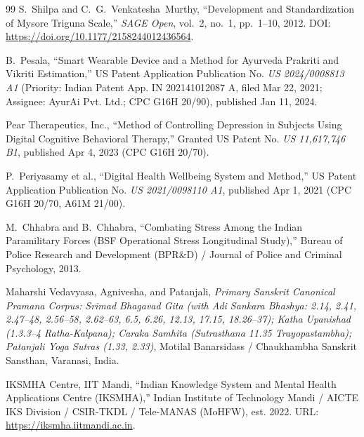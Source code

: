 \documentclass[11pt,a4paper]{article}
\begin{document}
\begin{thebibliography}{99}
S.~Shilpa and C.~G.~Venkatesha~Murthy,
``Development and Standardization of Mysore Triguna Scale,''
\textit{SAGE Open}, vol.~2, no.~1, pp.~1--10, 2012. DOI: \url{https://doi.org/10.1177/2158244012436564}.

B.~Pesala,
``Smart Wearable Device and a Method for Ayurveda Prakriti and Vikriti Estimation,''
US Patent Application Publication No. \textit{US 2024/0008813 A1} (Priority: Indian Patent App. IN 202141012087 A, filed Mar 22, 2021; Assignee: AyurAi Pvt. Ltd.; CPC G16H 20/90), published Jan 11, 2024.

Pear Therapeutics, Inc.,
``Method of Controlling Depression in Subjects Using Digital Cognitive Behavioral Therapy,''
Granted US Patent No. \textit{US 11,617,746 B1}, published Apr 4, 2023 (CPC G16H 20/70).

P.~Periyasamy et al.,
``Digital Health Wellbeing System and Method,''
US Patent Application Publication No. \textit{US 2021/0098110 A1}, published Apr 1, 2021 (CPC G16H 20/70, A61M 21/00).

M.~Chhabra and B.~Chhabra,
``Combating Stress Among the Indian Paramilitary Forces (BSF Operational Stress Longitudinal Study),''
Bureau of Police Research and Development (BPR\&D) / Journal of Police and Criminal Psychology, 2013.

Maharshi Vedavyasa, Agnivesha, and Patanjali,
\textit{Primary Sanskrit Canonical Pramana Corpus: Srimad Bhagavad Gita (with Adi Sankara Bhashya: 2.14, 2.41, 2.47--48, 2.56--58, 2.62--63, 6.5, 6.26, 12.13, 17.15, 18.26--37); Katha Upanishad (1.3.3--4 Ratha-Kalpana); Caraka Samhita (Sutrasthana 11.35 Trayopastambha); Patanjali Yoga Sutras (1.33, 2.33)},
Motilal Banarsidass / Chaukhambha Sanskrit Sansthan, Varanasi, India.

IKSMHA Centre, IIT Mandi,
``Indian Knowledge System and Mental Health Applications Centre (IKSMHA),''
Indian Institute of Technology Mandi / AICTE IKS Division / CSIR-TKDL / Tele-MANAS (MoHFW), est. 2022. URL: \url{https://iksmha.iitmandi.ac.in}.

\end{thebibliography}
\end{document}
